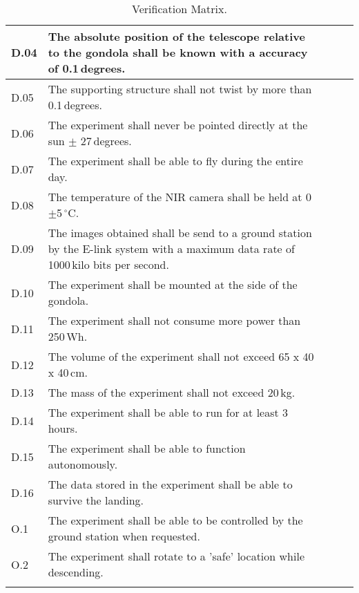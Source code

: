 \begin{longtable}[]{|m{}| m{} |m{} |m{}|m{}|}
D.04 & The absolute position of the telescope relative to the gondola shall be known with a accuracy of 0.1\,degrees.
& & & \\\hline

D.05 & The supporting structure shall not twist by more than 0.1\,degrees.
& & & \\\hline

D.06 & The experiment shall never be pointed directly at the sun $\pm$ 27\,degrees.
& & & \\\hline

D.07 & The experiment shall be able to fly during the entire day.
& & & \\\hline

D.08 & The temperature of the NIR camera shall be held at 0\,$\pm$5\,$^\circ$C.
& & & \\\hline

D.09 & The images obtained shall be send to a ground station by the E-link system with a maximum data rate of 1000\,kilo bits per second.
& & & \\\hline

D.10 & The experiment shall be mounted at the side of the gondola.
& & & \\\hline

D.11 & The experiment shall not consume more power than 250\,Wh.
& & & \\\hline

D.12 & The volume of the experiment shall not exceed 65 x 40 x 40\,cm.
& & & \\\hline

D.13 & The mass of the experiment shall not exceed 20\,kg.
& & & \\\hline

D.14 & The experiment shall be able to run for at least 3\,hours.
& & & \\\hline

D.15 & The experiment shall be able to function autonomously.
& & & \\\hline

D.16 & The data stored in the experiment shall be able to survive the landing.
& & & \\\hline

O.1 & The experiment shall be able to be controlled by the ground station when requested.
& & & \\\hline

O.2 & The experiment shall rotate to a 'safe' location while descending.
& & & \\\hline

\caption{Verification Matrix.}
\label{tab:var-mat}
\end{longtable}
\raggedbottom
